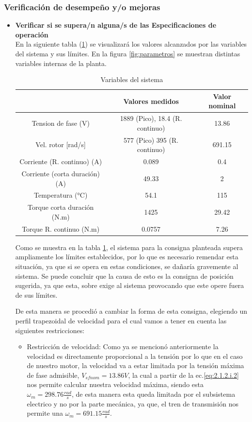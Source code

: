 \documentclass[10pt]{article}
\begin{document}
\subsubsection{Verificación de desempeño y/o mejoras}
\begin{itemize}
	\item \textbf{Verificar si se supera/n alguna/s de las Especificaciones de operación}\\
	En la siguiente tabla (\ref{tab:4}) se visualizará los valores alcanzados por las variables del sistema y sus límites. En la figura \ref{fig:parametros} se muestran distintas variables internas de la planta.
	\begin{table}[h!]
		\begin{center}
		\begin{tabular}{| c | c | c | }
		\hline
		  & Valores medidos & Valor nominal  \\ \hline
		 Tension de fase (V) & 1889 (Pico), 18.4 (R. continuo) & 13.86\\ \hline
		 Vel. rotor [rad/s]& 577 (Pico) 395 (R. continuo)&  691.15\\ \hline
		Corriente (R. continuo) (A) &0.089 & 0.4\\ \hline
		Corriente (corta duración) (A) &49.33 &2\\ \hline
		Temperatura (°C) &54.1 & 115\\ \hline
		Torque corta duración (N.m) & 1425 & 29.42\\ \hline
		Torque R. continuo (N.m) & 0.0757 & 7.26\\ \hline
		\end{tabular}
		\caption{Variables del sistema}
		\label{tab:4}
		\end{center}
		\end{table}



Como se muestra en la tabla \ref{tab:4}, el sistema para la consigna planteada supera ampliamente los límites establecidos,
 por lo que es necesario remendar esta situación, ya que si se opera en estas condiciones, se dañaría gravemente al sistema.
 Se puede concluir que la causa de esto es la consigna de posición sugerida, ya que esta, sobre exige al sistema provocando que este opere fuera 
 de sus límites.

 De esta manera se procedió a cambiar la forma de esta consigna, elegiendo un perfil trapezoidal de velocidad para el cual vamos a tener en cuenta las siguientes restricciones:
 \begin{itemize}
	 \item Restricción de velocidad: Como ya se mencionó anteriormente la velocidad es directamente proporcional a la tensión por lo que en el caso de nuestro motor, la velocidad
	 va a estar limitada por la tensión máxima de fase admisible, \textbf{$V_{sfnom}=13.86 V$}, la cual a partir de la ec.\ref{eq:2.1.2.i.2} nos permite calcular nuestra velocidad
	 máxima, siendo esta $\omega_{m}=298.76\frac{rad}{s}$, de esta manera esta queda limitada por el subsistema electrico y no por la parte mecánica, ya que, el tren de transmisión nos 
	 permite una $\omega_{m}=691.15\frac{rad}{s}$.


\end{itemize}
\end{itemize}
\end{document}
